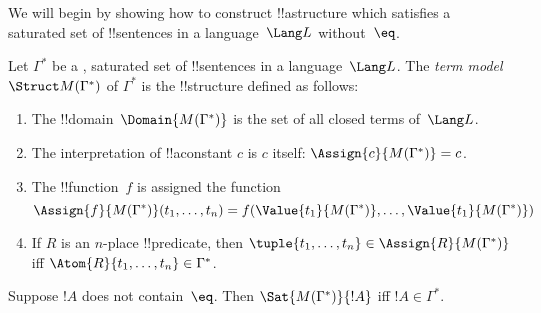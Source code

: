 \documentclass[../../../include/open-logic-section]{subfiles}
\begin{document}


We will begin by showing how to construct !!a{structure} which
satisfies a
saturated set of !!{sentence}s in a language~$\Lang L$ without~$\eq$.

\begin{defn}
Let $\Gamma^*$ be a
,
saturated set of !!{sentence}s in a language~$\Lang L$. The \emph{term
  model}~$\Struct M(\Gamma^*)$ of $\Gamma^*$ is the !!{structure}
defined as follows:
\begin{enumerate}
\item The !!{domain}~$\Domain{M(\Gamma^*)}$ is the set of all closed terms
  of~$\Lang L$.
\item The interpretation of !!a{constant} $c$ is $c$ itself:
  $\Assign{c}{M(\Gamma^*)} = c$.
\item The !!{function}~$f$ is assigned the function
\[
\Assign{f}{M(\Gamma^*)}(t_1, \dots, t_n) = f(\Value{t_1}{M(\Gamma^*)},
\dots, \Value{t_1}{M(\Gamma^*)})
\]
\item If $R$ is an $n$-place !!{predicate}, then $\tuple{t_1, \dots,
  t_n} \in \Assign{R}{M(\Gamma^*)}$ iff $\Atom{R}{t_1, \dots,
    t_n} \in \Gamma^*$.
\end{enumerate}
\end{defn}

\begin{lem}
 Suppose $!A$ does not contain~$\eq$. Then
$\Sat{M(\Gamma^*)}{!A}$ iff $!A \in \Gamma^*$.
\end{lem}
\end{document}
